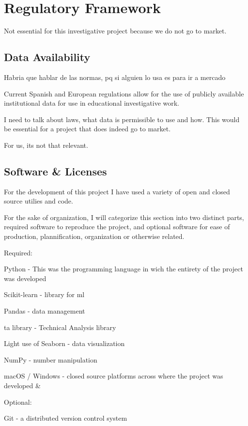 \documentclass[12pt]{report} %
\begin{document}
\chapter{Regulatory Framework}
Not essential for this investigative project because we do not go to market.

\section{Data Availability}
Habria que hablar de las normas, pq si alguien lo usa es para ir a mercado

Current Spanish and European regulations allow for the use of publicly available institutional data for use in educational investigative work.

I need to talk about laws, what data is permissible to use and how. This would be essential for a project that does indeed go to market.

For us, its not that relevant.

\section{Software \& Licenses}

For the development of this project I have used a variety of open and closed source utilies and code.

For the sake of organization, I will categorize this section into two distinct parts, required software to reproduce the project, and optional software for ease of production, plannification, organization or otherwise related.

Required:

Python - This was the programming language in wich the entirety of the project was developed \cite{python}

Scikit-learn - library for ml \cite{scikit-learn}

Pandas - data management \cite{pandas}

ta library - Technical Analysis library\cite{ta-lib}

Light use of Seaborn - data visualization \cite{seaborn}

NumPy - number manipulation \cite{numpy}

macOS / Windows - closed source platforms across where the project was developed \cite{macos} \& \cite{windows}

Optional:

Git - a distributed version control system \cite{git}
\end{document}
